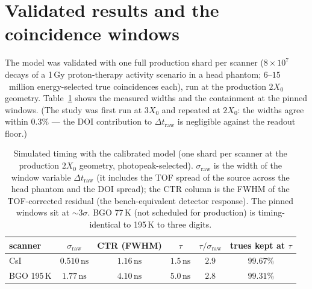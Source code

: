 \documentclass[11pt,a4paper]{article}
\newcommand{\ns}{\,\mathrm{ns}}
\begin{document}
\section{Validated results and the coincidence windows}
\label{sec:results}

The model was validated with one full production shard per scanner ($8\times10^7$ decays of a
1\,Gy proton-therapy activity scenario in a head phantom; $6$--$15$~million
energy-selected true coincidences each), run at the production $2X_0$ geometry.
Table~\ref{tab:results} shows the measured widths and the containment at the pinned windows.
(The study was first run at $3X_0$ and repeated at $2X_0$: the widths agree within $0.3\%$ ---
the DOI contribution to $\Delta t_{\mathrm{raw}}$ is negligible against the readout floor.)

\begin{table}[ht]
\centering
\caption{Simulated timing with the calibrated model (one shard per scanner at the production
$2X_0$ geometry, photopeak-selected). $\sigma_{\mathrm{raw}}$ is the width of the window
variable $\Delta t_{\mathrm{raw}}$ (it includes the TOF spread of the source across the head
phantom and the DOI spread); the CTR column is the FWHM of the TOF-corrected residual (the
bench-equivalent detector response). The pinned windows sit at ${\sim}3\sigma$. BGO 77\,K
(not scheduled for production) is timing-identical to 195\,K to three digits.}
\label{tab:results}
\vspace{2mm}
\begin{tabular}{lccccc}
\toprule
scanner & $\sigma_{\mathrm{raw}}$ & CTR (FWHM) & $\tau$ & $\tau/\sigma_{\mathrm{raw}}$ &
trues kept at $\tau$ \\
\midrule
CsI       & $0.510\ns$ & $1.16\ns$ & $1.5\ns$ & $2.9$ & $99.67\%$ \\
BGO 195\,K & $1.77\ns$  & $4.10\ns$ & $5.0\ns$ & $2.8$ & $99.31\%$ \\
\bottomrule
\end{tabular}
\end{table}
\end{document}

